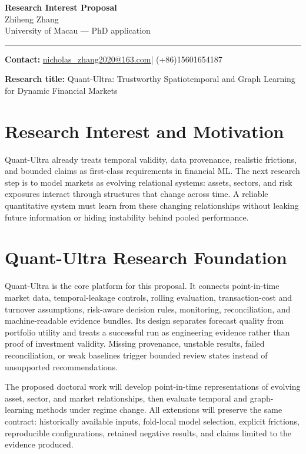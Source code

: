 \documentclass[11pt]{article}
\makeatletter
\newcommand{\ApplicantName}{Zhiheng Zhang}
\newcommand{\ApplicantEmail}{\href{mailto:nicholas_zhang2020@163.com}{nicholas\_zhang2020@163.com}}
\newcommand{\ApplicantPhone}{(+86)15601654187}
\makeatother
\begin{document}
\begin{center}
{\LARGE\bfseries Research Interest Proposal}\\[0.25em]
{\large \ApplicantName}\\
University of Macau --- PhD application
\end{center}
\vspace{0.35em}\hrule\vspace{0.65em}

\setlength{\parskip}{0.45em}
\textbf{Contact:} \ApplicantEmail\quad | \quad \ApplicantPhone

\textbf{Research title:} Quant-Ultra: Trustworthy Spatiotemporal and Graph Learning for Dynamic Financial Markets

\section*{Research Interest and Motivation}
Quant-Ultra already treats temporal validity, data provenance, realistic frictions, and bounded claims as first-class requirements in financial ML. The next research step is to model markets as evolving relational systems: assets, sectors, and risk exposures interact through structures that change across time. A reliable quantitative system must learn from these changing relationships without leaking future information or hiding instability behind pooled performance.

\section*{Quant-Ultra Research Foundation}
Quant-Ultra is the core platform for this proposal. It connects point-in-time market data, temporal-leakage controls, rolling evaluation, transaction-cost and turnover assumptions, risk-aware decision rules, monitoring, reconciliation, and machine-readable evidence bundles. Its design separates forecast quality from portfolio utility and treats a successful run as engineering evidence rather than proof of investment validity. Missing provenance, unstable results, failed reconciliation, or weak baselines trigger bounded review states instead of unsupported recommendations.

The proposed doctoral work will develop point-in-time representations of evolving asset, sector, and market relationships, then evaluate temporal and graph-learning methods under regime change. All extensions will preserve the same contract: historically available inputs, fold-local model selection, explicit frictions, reproducible configurations, retained negative results, and claims limited to the evidence produced.
\end{document}
